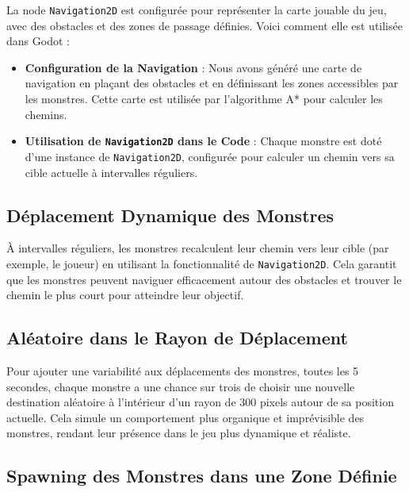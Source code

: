 La node \texttt{Navigation2D} est configurée pour représenter la carte jouable du jeu, 
avec des obstacles et des zones de passage définies. Voici comment elle est utilisée dans Godot :
\\

\begin{itemize}
    \item \textbf{Configuration de la Navigation} :
     Nous avons généré une carte de navigation en plaçant des obstacles et en définissant les zones accessibles par les monstres.
      Cette carte est utilisée par l'algorithme A* pour calculer les chemins.
    \\

    \item \textbf{Utilisation de \texttt{Navigation2D} dans le Code} : Chaque monstre 
    est doté d'une instance de \texttt{Navigation2D}, configurée pour calculer un chemin vers sa cible actuelle à intervalles réguliers.
\end{itemize}

\subsection*{Déplacement Dynamique des Monstres}

À intervalles réguliers, les monstres recalculent leur chemin vers leur cible (par exemple, le joueur) en utilisant la fonctionnalité
 de \texttt{Navigation2D}. Cela garantit que les monstres peuvent naviguer efficacement autour des obstacles et trouver le chemin le plus court pour
  atteindre leur objectif.



\subsection*{Aléatoire dans le Rayon de Déplacement}

Pour ajouter une variabilité aux déplacements des monstres, toutes les 5 secondes, chaque monstre a une chance sur trois de choisir une nouvelle
 destination aléatoire à l'intérieur d'un rayon de 300 pixels autour de sa position actuelle. Cela simule un comportement plus organique et imprévisible des monstres,
  rendant leur présence dans le jeu plus dynamique et réaliste.


\subsection*{Spawning des Monstres dans une Zone Définie}

